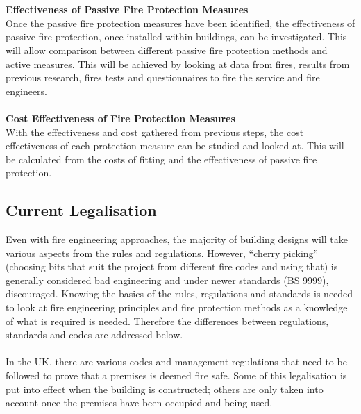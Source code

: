 \documentclass[table,a4paper,oneside]{book}
\begin{document}
\\
\\
\textbf{Effectiveness of Passive Fire Protection Measures}
\\
Once the passive fire protection measures have been identified, the effectiveness of passive fire protection, once installed within buildings, can be investigated. This will allow comparison between different passive fire protection methods and active measures. This will be achieved by looking at data from fires, results from previous research, fires tests and questionnaires to fire the service and fire engineers.
\\
\\
\textbf{Cost Effectiveness of Fire Protection Measures}
\\
With the effectiveness and cost gathered from previous steps, the cost effectiveness of each protection measure can be studied and looked at. This will be calculated from the costs of fitting and the effectiveness of passive fire protection.

\subsection{Current Legalisation}
Even with fire engineering approaches, the majority of building designs will take various aspects from the rules and regulations. However, ``cherry picking'' (choosing bits that suit the project from different fire codes and using that) is generally considered bad engineering and under newer standards (BS 9999), discouraged.
Knowing the basics of the rules, regulations and standards is needed to look at fire engineering principles and fire protection methods as a knowledge of what is required is needed. Therefore the differences between regulations, standards and codes are addressed below.
\\
\\
In the UK, there are various codes and management regulations that need to be followed to prove that a premises is deemed fire safe. Some of this legalisation is put into effect when the building is constructed; others are only taken into account once the premises have been occupied and being used.
\end{document}
